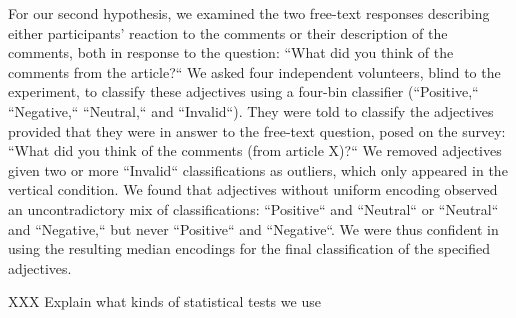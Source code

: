 For our second hypothesis, we examined the two free-text responses describing either participants' reaction to the comments or their description of the comments, both in response to the question: ``What did you think of the comments from the article?`` We asked four independent volunteers, blind to the experiment, to classify these adjectives using a four-bin classifier (``Positive,`` ``Negative,`` ``Neutral,`` and ``Invalid``). They were told to classify the adjectives provided that they were in answer to the free-text question, posed on the survey: ``What did you think of the comments (from article X)?`` We removed adjectives given two or more ``Invalid`` classifications as outliers, which only appeared in the vertical condition. We found that adjectives without uniform encoding observed an uncontradictory mix of classifications: ``Positive`` and ``Neutral`` or ``Neutral`` and ``Negative,`` but never ``Positive`` and ``Negative``. We were thus confident in using the resulting median encodings for the final classification of the specified adjectives. 

XXX Explain what kinds of statistical tests we use

